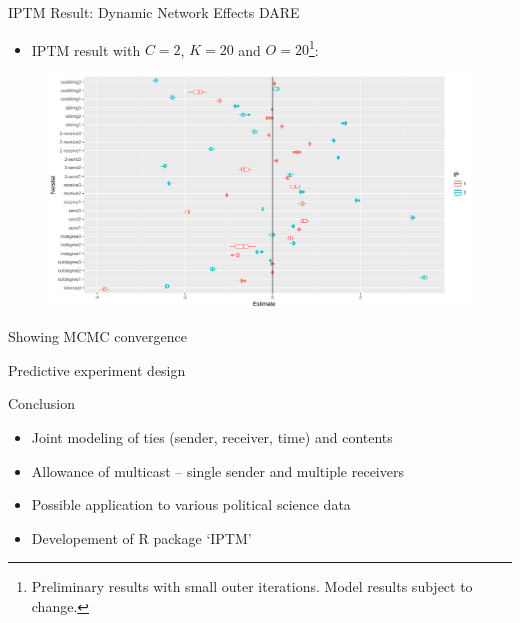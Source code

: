 \documentclass[10pt]{beamer}
\def\bni{\begin{itemize}} \def\ei{\end{itemize}}
\theoremstyle{definition}
\theoremstyle{remark}
\begin{document}
\begin{frame}{IPTM Result: Dynamic Network Effects DARE}
	\bni \item IPTM result with $C=2$, $K=20$ and $O= 20$\footnote{Preliminary results with small outer iterations. Model results subject to change.}:
	\ei
	\begin{figure}
		\includegraphics[width=1\textwidth]{figures/DareBplot2.pdf}
	\end{figure}	
\end{frame}

\begin{frame}

Showing MCMC convergence

\end{frame}


\begin{frame}
Predictive experiment design
\end{frame}


\begin{frame}{Conclusion}
 \bni
 \item Joint modeling of ties (sender, receiver, time) and contents
 	\vspace{0.4cm}
 \item Allowance of multicast -- single sender and multiple receivers
 	\vspace{0.4cm}
 \item Possible application to various political science data
 	\vspace{0.4cm}
 	\item Developement of R package `IPTM'
 \ei
\end{frame}
\end{document}
